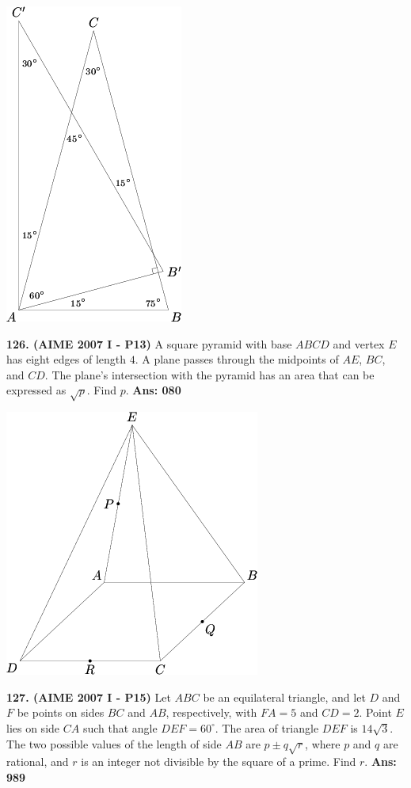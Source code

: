 \documentclass[letterpaper,10pt,addpoints]{exam}
\begin{document}
\begin{center}
\includegraphics[scale=0.3]{AIME_I_2007-12.png}
\end{center}

\textbf{126. (AIME 2007 I - P13) }   A square pyramid with base $ABCD$ and vertex $E$ has eight edges of length $4$. A plane passes through the midpoints of $AE$, $BC$, and $CD$. The plane's intersection with the pyramid has an area that can be expressed as $\sqrt{p}$. Find $p$.  \quad\textbf{Ans: 080}

\begin{center}
\includegraphics[scale=0.4]{AIME_I_2007-13.png}
\end{center}


\textbf{127. (AIME 2007 I - P15) }   Let $ABC$ be an equilateral triangle, and let $D$ and $F$ be points on sides $BC$ and $AB$, respectively, with $FA = 5$ and $CD = 2$. Point $E$ lies on side $CA$ such that angle $DEF = 60^{\circ}$. The area of triangle $DEF$ is $14\sqrt{3}$. The two possible values of the length of side $AB$ are $p \pm q \sqrt{r}$, where $p$ and $q$ are rational, and $r$ is an integer not divisible by the square of a prime. Find $r$.  \quad\textbf{Ans: 989}\\
\end{document}
